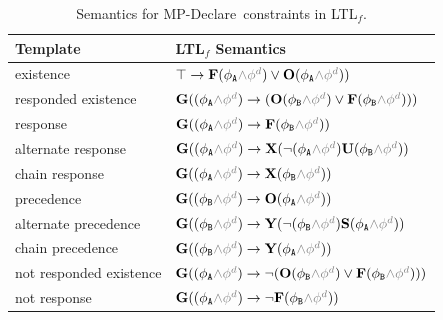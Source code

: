 \begin{table}[t!]
\caption{Semantics for MP-Declare\ constraints in LTL$_f$. \label{tbl:timed-mfotl}}
\centering
\scriptsize{
\begin{tabular}{ll}
\toprule
\textbf{Template} & \textbf{LTL$_f$ Semantics} \\
\midrule
existence & $\top \rightarrow \lfuture (\phi_{\texttt{A}} \textcolor{gray}{\wedge \phi^d}) \vee \lonce (\phi_{\texttt{A}} \textcolor{gray}{\wedge \phi^d}))$ \\
\midrule
responded existence  & $\lglobally( (\phi_{\texttt{A}} \textcolor{gray}{\wedge \phi^d}) \rightarrow (\lonce (\phi_{\texttt{B}} \textcolor{gray}{\wedge \phi^d}) \vee \lfuture (\phi_{\texttt{B}} \textcolor{gray}{\wedge \phi^d})))$ \\
\midrule
response &  $\lglobally(  (\phi_{\texttt{A}} \textcolor{gray}{\wedge \phi^d}) \rightarrow \lfuture (\phi_{\texttt{B}} \textcolor{gray}{\wedge \phi^d}))$ \\
alternate response  & $ \lglobally( (\phi_{\texttt{A}} \textcolor{gray}{\wedge \phi^d}) \rightarrow \lnext(\neg (\phi_{\texttt{A}} \textcolor{gray}{\wedge \phi^d}) \luntil (\phi_{\texttt{B}} \textcolor{gray}{\wedge \phi^d}))$ \\
chain response &  $\lglobally( (\phi_{\texttt{A}} \textcolor{gray}{\wedge \phi^d}) \rightarrow \lnext (\phi_{\texttt{B}} \textcolor{gray}{\wedge \phi^d}))$ \\
\midrule
precedence &  $\lglobally( (\phi_{\texttt{B}} \textcolor{gray}{\wedge \phi^d}) \rightarrow \lonce (\phi_{\texttt{A}} \textcolor{gray}{\wedge \phi^d}))$ \\
alternate precedence & $ \lglobally( (\phi_{\texttt{B}} \textcolor{gray}{\wedge \phi^d}) \rightarrow \lyesterday(\neg (\phi_{\texttt{B}} \textcolor{gray}{\wedge \phi^d}) \lsince (\phi_{\texttt{A}} \textcolor{gray}{\wedge \phi^d}))$ \\
chain precedence & $\lglobally( (\phi_{\texttt{B}} \textcolor{gray}{\wedge \phi^d}) \rightarrow \lyesterday (\phi_{\texttt{A}} \textcolor{gray}{\wedge \phi^d}))$ \\
\midrule
not responded existence  &
$\lglobally( (\phi_{\texttt{A}} \textcolor{gray}{\wedge \phi^d}) \rightarrow \neg (\lonce (\phi_{\texttt{B}}   \textcolor{gray}{\wedge \phi^d}) \vee \lfuture (\phi_{\texttt{B}} \textcolor{gray}{\wedge \phi^d})))$ \\
not response  & $\lglobally(  (\phi_{\texttt{A}} \textcolor{gray}{\wedge \phi^d}) \rightarrow \neg \lfuture (\phi_{\texttt{B}} \textcolor{gray}{\wedge \phi^d}))$ \\

\end{tabular}}
\end{table}
